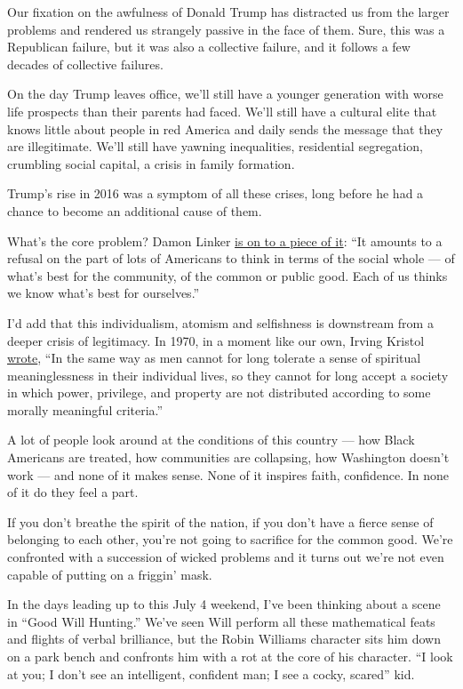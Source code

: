 Our fixation on the awfulness of Donald Trump has distracted us from the
larger problems and rendered us strangely passive in the face of them.
Sure, this was a Republican failure, but it was also a collective
failure, and it follows a few decades of collective failures.

On the day Trump leaves office, we'll still have a younger generation
with worse life prospects than their parents had faced. We'll still have
a cultural elite that knows little about people in red America and daily
sends the message that they are illegitimate. We'll still have yawning
inequalities, residential segregation, crumbling social capital, a
crisis in family formation.

Trump's rise in 2016 was a symptom of all these crises, long before he
had a chance to become an additional cause of them.

What's the core problem? Damon Linker
\href{https://theweek.com/articles/922812/coronavirus-revealing-shattered-country}{is
on to a piece of it}: ``It amounts to a refusal on the part of lots of
Americans to think in terms of the social whole --- of what's best for
the community, of the common or public good. Each of us thinks we know
what's best for ourselves.''

I'd add that this individualism, atomism and selfishness is downstream
from a deeper crisis of legitimacy. In 1970, in a moment like our own,
Irving Kristol
\href{https://www.nationalaffairs.com/public_interest/detail/when-virtue-loses-all-her-loveliness-some-reflections-on-capitalism-and-the-free-society}{wrote},
``In the same way as men cannot for long tolerate a sense of spiritual
meaninglessness in their individual lives, so they cannot for long
accept a society in which power, privilege, and property are not
distributed according to some morally meaningful criteria.''

A lot of people look around at the conditions of this country --- how
Black Americans are treated, how communities are collapsing, how
Washington doesn't work --- and none of it makes sense. None of it
inspires faith, confidence. In none of it do they feel a part.

If you don't breathe the spirit of the nation, if you don't have a
fierce sense of belonging to each other, you're not going to sacrifice
for the common good. We're confronted with a succession of wicked
problems and it turns out we're not even capable of putting on a
friggin' mask.

In the days leading up to this July 4 weekend, I've been thinking about
a scene in ``Good Will Hunting.'' We've seen Will perform all these
mathematical feats and flights of verbal brilliance, but the Robin
Williams character sits him down on a park bench and confronts him with
a rot at the core of his character. ``I look at you; I don't see an
intelligent, confident man; I see a cocky, scared'' kid.

